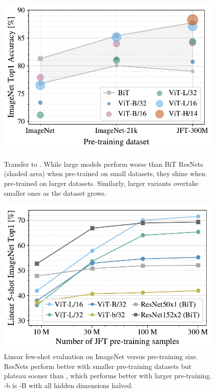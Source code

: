 \begin{figure}
    \begin{minipage}[t]{0.47\textwidth}
        \centering
        \includegraphics[width=1.0\textwidth]{images/dataset_analysis/transvolution-i1k-scaling}
        \caption{Transfer to \imagenet. While large \oursabbrv{} models perform worse than BiT ResNets (shaded area) when pre-trained on small datasets, they shine when pre-trained on larger datasets. Similarly, larger \oursabbrv{}  variants overtake smaller ones as the dataset grows.}
        \label{fig:imagenet_imagenet21k_jft}
    \end{minipage}\;\;\;\;
    \begin{minipage}[t]{0.47\textwidth}
        \centering
        \includegraphics[width=1.0\textwidth]{images/dataset_analysis/imagenet_5shot}
        \caption{Linear few-shot evaluation on ImageNet versus pre-training size. 
        ResNets perform better with smaller pre-training datasets but plateau sooner than \oursabbrv{}, which performs better with larger pre-training. \oursabbrv-b is \oursabbrv-B with all hidden dimensions halved.}
        \label{fig:jft_amount_of_data}
    \end{minipage}
    \vspace{-3mm}
\end{figure}

